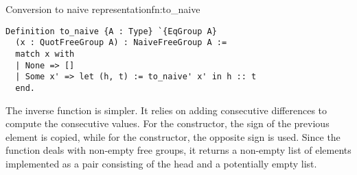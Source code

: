 \begin{func}{Conversion to naive representation}{fn:to_naive}
\begin{verbatim}
Definition to_naive {A : Type} `{EqGroup A} 
  (x : QuotFreeGroup A) : NaiveFreeGroup A :=
  match x with
  | None => []
  | Some x' => let (h, t) := to_naive' x' in h :: t
  end.
\end{verbatim}
\end{func}
The inverse function  is simpler. It relies on adding consecutive differences to compute the consecutive values. For the  constructor, the sign of the previous element is copied, while for the  constructor, the opposite sign is used. Since the  function deals with non-empty free groups, it returns a non-empty list of elements implemented as a pair consisting of the head and a potentially empty list.

